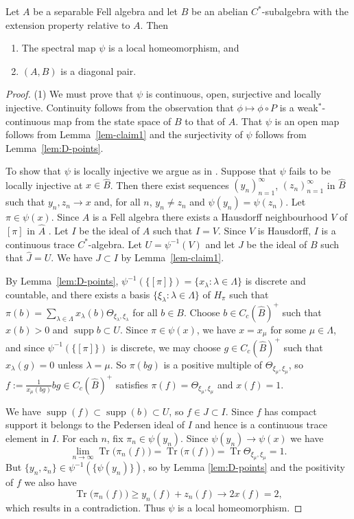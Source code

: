 \documentclass[12pt,a4paper]{amsart}
\newcommand{\supp}{\operatorname{supp}}
\newcommand{\tr}{\operatorname{Tr}}
\newcommand{\Hh}{{H}}
\begin{document}
\begin{thm}\label{thm:ext prop => diag}
Let $A$ be a separable Fell algebra and let $B$ be an abelian
$C^*$-subalgebra with the  extension property relative to $A$.
Then
\begin{enumerate}
\item The spectral map $\psi$  is a local homeomorphism,
    and
\item $(A,B)$ is a diagonal pair.
\end{enumerate}
\end{thm}
\begin{proof}
(1) We must prove that $\psi$ is continuous, open, surjective
and locally injective. Continuity follows from the observation
that $\phi \mapsto \phi \circ P$ is a weak$^*$-continuous map
from the state space of $B$ to that of $A$. That $\psi$ is an
open map follows from Lemma~\ref{lem-claim1} and the
surjectivity of $\psi$ follows from Lemma~\ref{lem:D-points}.

To show that $\psi$ is locally injective we argue as in
\cite[Theorem~2]{Kumjian1988}. Suppose that $\psi$ fails to be
locally injective at $x\in\widehat B$.   Then there exist
sequences $(y_n)^\infty_{n=1}$, $(z_n)^\infty_{n=1}$ in
$\widehat B$ such that $y_n, z_n \to x$ and, for all $n$,
$y_n\neq z_n$ and $\psi(y_n)=\psi(z_n)$.  Let $\pi\in\psi(x)$.
Since $A$ is a Fell algebra there exists a Hausdorff
neighbourhood $V$ of $[\pi]$ in $\widehat A$
\cite[Corollary~3.4]{AS}. Let $I$ be the ideal of $A$ such that
$\widehat I=V$. Since $V$ is Hausdorff, $I$ is a continuous
trace $C^*$-algebra. Let $U=\psi^{-1}(V)$ and let $J$ be the
ideal of $B$ such that $\widehat J=U$.  We have $J\subset I$ by
Lemma~\ref{lem-claim1}.

By Lemma~\ref{lem:D-points}, $\psi^{-1}(\{[\pi]\}) = \{x_\lambda
: \lambda \in \Lambda\}$ is discrete and countable, and there
exists a basis $\{\xi_\lambda : \lambda \in \Lambda\}$ of
$\Hh_\pi$ such that $\pi(b)=\sum_{\lambda \in \Lambda}
x_\lambda(b)\Theta_{\xi_\lambda,\xi_\lambda}$ for all $b \in B$.
Choose $b\in C_c(\widehat B)^+$ such that $x(b)>0$ and $\supp
b\subset U$. Since $\pi \in \psi(x)$, we have $x = x_\mu$ for
some $\mu \in \Lambda$, and since $\psi^{-1}(\{[\pi]\})$ is
discrete, we may choose $g\in C_c(\widehat B)^+$ such that
$x_\lambda(g)=0$ unless $\lambda = \mu$. So $\pi(bg)$ is a
positive multiple of $\Theta_{\xi_\mu,\xi_\mu}$, so $f :=
\frac{1}{x_\mu(bg)} bg \in C_c(\widehat B)^+$ satisfies
$\pi(f)=\Theta_{\xi_\mu,\xi_\mu}$ and $x(f)=1$.

We have $\supp(f) \subset \supp(b) \subset U$, so $f \in J
\subset I$. Since $f$ has compact support it belongs to the
Pedersen ideal of $I$ and hence is a continuous trace element
in $I$. For each $n$, fix $\pi_n\in \psi(y_n)$. Since
$\psi(y_n)\to \psi(x)$ we have
\[
\lim_{n \to \infty} \tr\big( \pi_n(f)\big)
    = \tr \big(\pi(f)\big)
    = \tr  \Theta_{\xi_\mu, \xi_\mu}
    = 1.
\]
But $\{y_n,z_n\}\in\psi^{-1}(\{\psi(y_n)\})$, so by Lemma
\ref{lem:D-points} and the positivity of $f$ we also have
\[
    \tr\big(\pi_n(f)\big)\geq y_n(f) + z_n(f)\to 2x(f)=2,
\]
which results in a contradiction.
Thus $\psi$ is  %
a local homeomorphism.


\end{proof}
\end{document}
